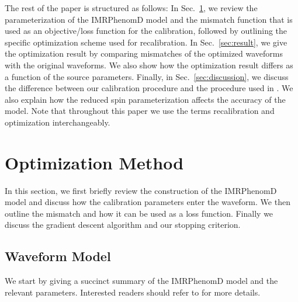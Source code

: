 \documentclass[twocolumn]{aastex631}
\begin{document}
The rest of the paper is structured as follows: In Sec.~\ref{sec:method}, we
review the parameterization of the IMRPhenomD model and the mismatch function
that is used as an objective/loss function for the calibration, followed by outlining the
specific optimization scheme used for recalibration. In
Sec.~\ref{sec:result}, we give the optimization result by comparing mismatches
of the optimized waveforms with the original waveforms. We also show how the
optimization result differs as a function of the source parameters. Finally, in
Sec.~\ref{sec:discussion}, we discuss the difference between our calibration
procedure and the procedure used in \citep{khan2016frequency}. We also explain how the reduced spin
parameterization affects the accuracy of the model. 
Note that throughout this paper we use the terms recalibration and optimization interchangeably.

\section{Optimization Method} \label{sec:method}

In this section, we first briefly review the construction of the IMRPhenomD model and discuss
how the calibration parameters enter the waveform.
We then outline the mismatch and how it can be used as a loss function. 
Finally we discuss the gradient descent algorithm and our stopping criterion.

\subsection{Waveform Model} \label{subsec:waveform_model}

We start by giving a succinct summary of the IMRPhenomD model and the relevant parameters.
Interested readers should refer to \citep{khan2016frequency} for more details.
\end{document}
